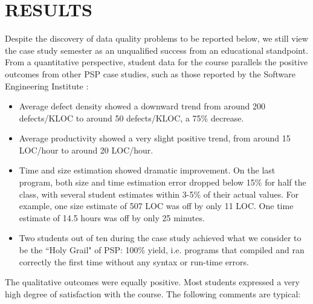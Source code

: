
\section{RESULTS}

Despite the discovery of data quality problems to be reported below, we
still view the case study semester as an unqualified success from an
educational standpoint.  From a quantitative perspective, student data for
the course parallels the positive outcomes from other PSP
case studies, such as those reported by the Software
Engineering Institute \cite{CMU97}:

\begin{itemize}
\item Average defect density showed a downward trend from around 200
    defects/KLOC to around 50 defects/KLOC, a 75\% decrease.

\item Average productivity showed a very slight positive
    trend, from around 15 LOC/hour to around 20 LOC/hour.

\item Time and size estimation showed dramatic improvement. On the
    last program, both size and time estimation error
    dropped below 15\% for half the class, with several
    student estimates within 3-5\% of their actual values. For
    example, one size estimate of 507 LOC was
    off by only 11 LOC. One time estimate of 14.5 hours
    was off by only 25 minutes.

\item Two students out of ten during the case study achieved what we
    consider to be the ``Holy Grail" of PSP: 100\% yield,
    i.e. programs that compiled and ran correctly the first
    time without any syntax or run-time errors.
\end{itemize}

The qualitative outcomes were equally positive. Most students expressed a
very high degree of satisfaction with the course. The following
comments are typical:

